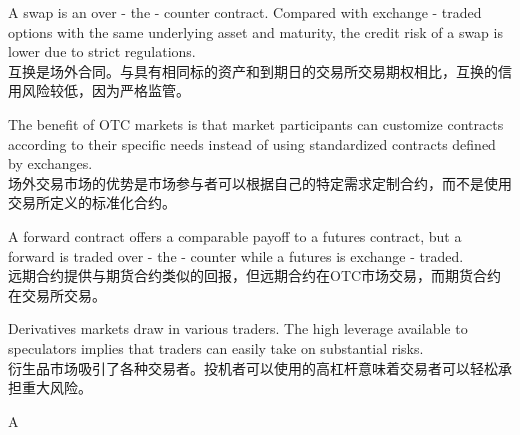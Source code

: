 \documentclass{article}
\begin{document}
    \begin{choices}
        \item A swap is an over - the - counter contract. Compared with exchange - traded options with the same underlying asset and maturity, the credit risk of a swap is lower due to strict regulations.\\
        互换是场外合同。与具有相同标的资产和到期日的交易所交易期权相比，互换的信用风险较低，因为严格监管。
        \item The benefit of OTC markets is that market participants can customize contracts according to their specific needs instead of using standardized contracts defined by exchanges.\\
        场外交易市场的优势是市场参与者可以根据自己的特定需求定制合约，而不是使用交易所定义的标准化合约。
        \item A forward contract offers a comparable payoff to a futures contract, but a forward is traded over - the - counter while a futures is exchange - traded.\\
        远期合约提供与期货合约类似的回报，但远期合约在OTC市场交易，而期货合约在交易所交易。
        \item Derivatives markets draw in various traders. The high leverage available to speculators implies that traders can easily take on substantial risks.\\
        衍生品市场吸引了各种交易者。投机者可以使用的高杠杆意味着交易者可以轻松承担重大风险。
    \end{choices}
    
    \begin{correctanswer}
        A
    \end{correctanswer}
    
\end{document}
